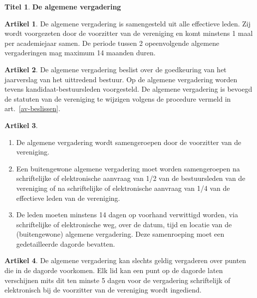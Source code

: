 \documentclass[a4paper,10pt]{article}
\theoremstyle{definition}
\newtheorem{titel}{\newline\Large Titel}
\newtheorem{artikelbase}{\large Artikel}
\newenvironment{artikel}
  {\begin{artikelbase}}
  {\smallskip
   \end{artikelbase}}
\newcommand{\ttext}[1]{\Large \textbf{#1} \normalsize}
\newcommand{\ttextcr}{\hfill\newline}
\newcommand{\ttextenum}{\mbox{}}
\begin{document}
\begin{titel}\ttext{De algemene vergadering}

  \begin{artikel}\ttextcr
    De algemene vergadering is samengesteld uit alle effectieve leden.
    Zij wordt voorgezeten door de voorzitter van de vereniging en komt minstens 1 maal per academiejaar samen.
    De periode tussen 2 opeenvolgende algemene vergaderingen mag maximum 14 maanden duren.
  \end{artikel}

  \begin{artikel}\ttextcr
    De algemene vergadering beslist over de goedkeuring van het jaarverslag van het uittredend bestuur.
    Op de algemene vergadering worden tevens kandidaat-bestuursleden voorgesteld.
    De algemene vergadering is bevoegd de statuten van de vereniging te wijzigen volgens de procedure vermeld in art.~\ref{av-beslissen}.
  \end{artikel}

  \begin{artikel}\label{av-samenroeping}\ttextenum
    \begin{enumerate}
      \item
        De algemene vergadering wordt samengeroepen door de voorzitter van de vereniging.
      \item
        Een buitengewone algemene vergadering moet worden samengeroepen na schriftelijke of elektronische aanvraag van 1/2 van de bestuursleden van de vereniging of na schriftelijke of elektronische aanvraag van 1/4 van de effectieve leden van de vereniging.
      \item\label{av-samenroeping-verwittiging}
        De leden moeten minstens 14 dagen op voorhand verwittigd worden, via schriftelijke of elektronische weg, over de datum, tijd en locatie van de (buitengewone) algemene vergadering.
        Deze samenroeping moet een gedetailleerde dagorde bevatten.
    \end{enumerate}
  \end{artikel}

  \begin{artikel}\label{av-dagorde}\ttextcr
    De algemene vergadering kan slechts geldig vergaderen over punten die in de dagorde voorkomen.
    Elk lid kan een punt op de dagorde laten verschijnen mits dit ten minste 5 dagen voor de vergadering schriftelijk of elektronisch bij de voorzitter van de vereniging wordt ingediend.
  \end{artikel}


\end{titel}
\end{document}
